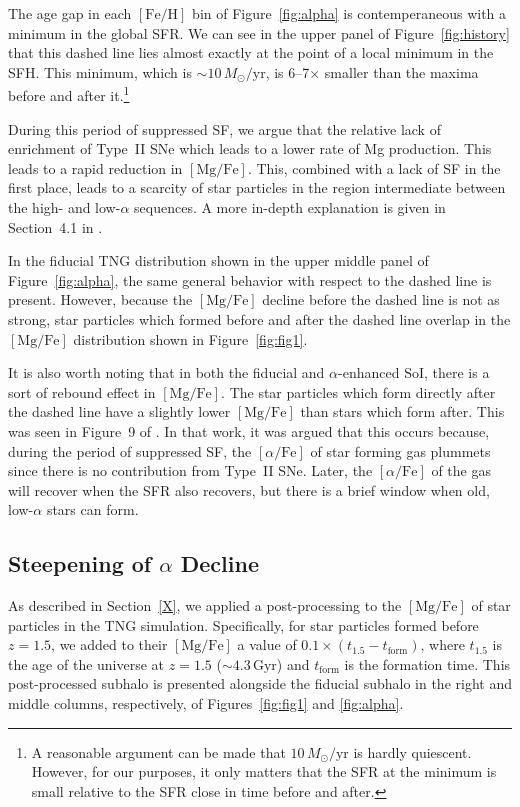 \documentclass[linenumbers, twocolumn]{aastex631}
\newcommand{\Msun}{\ensuremath{M_{\odot}}}
\newcommand{\Gyr}{\ensuremath{\textrm{Gyr}}}
\newcommand{\FeH}{\ensuremath{[\textrm{Fe}/\textrm{H}]}}
\newcommand{\MgFe}{\ensuremath{[\textrm{Mg}/\textrm{Fe}]}}
\newcommand{\alphaFe}{\ensuremath{[\alpha/\textrm{Fe}]}}
\newcommand{\Msunyr}{\ensuremath{\Msun/\textrm{yr}}}
\begin{document}
The age gap in each \FeH{} bin of Figure~\ref{fig:alpha} is contemperaneous with a minimum in the global SFR. We can see in the upper panel of Figure~\ref{fig:history} that this dashed line lies almost exactly at the point of a local minimum in the SFH. This minimum, which is $\sim10\,\Msunyr$, is 6--7$\times$ smaller than the maxima before and after it.\footnote{A reasonable argument can be made that $10\,\Msunyr$ is hardly quiescent. However, for our purposes, it only matters that the SFR at the minimum is small relative to the SFR close in time before and after.}

During this period of suppressed SF, we argue that the relative lack of enrichment of Type~II SNe which leads to a lower rate of Mg production. This leads to a rapid reduction in \MgFe{}. This, combined with a lack of SF in the first place, leads to a scarcity of star particles in the region intermediate between the high- and low-$\alpha$ sequences. A more in-depth explanation is given in Section~4.1 in \citet{2024arXiv240707985B}. 

In the fiducial TNG distribution shown in the upper middle panel of Figure~\ref{fig:alpha}, the same general behavior with respect to the dashed line is present. However, because the \MgFe{} decline before the dashed line is not as strong, star particles which formed before and after the dashed line overlap in the \MgFe{} distribution shown in Figure~\ref{fig:fig1}. 

It is also worth noting that in both the fiducial and $\alpha$-enhanced SoI, there is a sort of rebound effect in \MgFe{}. The star particles which form directly after the dashed line have a slightly lower \MgFe{} than stars which form after. This was seen in Figure~9 of \citet{2024arXiv240707985B}. In that work, it was argued that this occurs because, during the period of suppressed SF, the \alphaFe{} of star forming gas plummets since there is no contribution from Type~II SNe. Later, the \alphaFe{} of the gas will recover when the SFR also recovers, but there is a brief window when old, low-$\alpha$ stars can form.

\subsection{Steepening of $\alpha$ Decline}\label{ssec:sfe}
As described in Section~\ref{X}, we applied a post-processing to the \MgFe{} of star particles in the TNG simulation. Specifically, for star particles formed before $z=1.5$, we added to their \MgFe{} a value of $0.1\times\left(t_{1.5}-t_{\textrm{form}}\right)$, where $t_{1.5}$ is the age of the universe at $z=1.5$ ($\sim4.3\,\Gyr$) and $t_{\textrm{form}}$ is the formation time. This post-processed subhalo is presented alongside the fiducial subhalo in the right and middle columns, respectively, of Figures~\ref{fig:fig1} and \ref{fig:alpha}.
\end{document}
